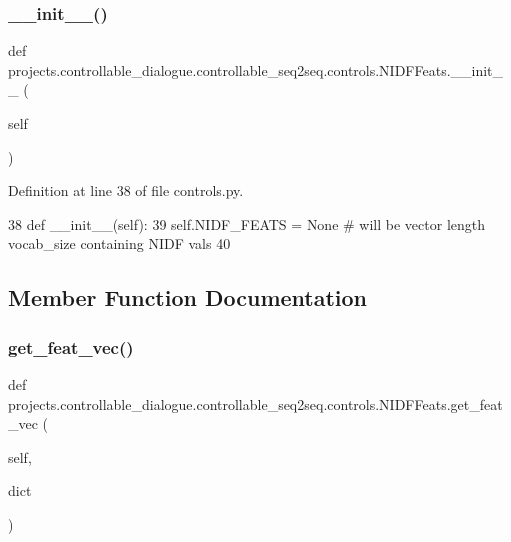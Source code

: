 \subsubsection{\texorpdfstring{\+\_\+\+\_\+init\+\_\+\+\_\+()}{\_\_init\_\_()}}
{\footnotesize\ttfamily def projects.\+controllable\+\_\+dialogue.\+controllable\+\_\+seq2seq.\+controls.\+N\+I\+D\+F\+Feats.\+\_\+\+\_\+init\+\_\+\+\_\+ (\begin{DoxyParamCaption}\item[{}]{self }\end{DoxyParamCaption})}



Definition at line 38 of file controls.\+py.


\begin{DoxyCode}
38     \textcolor{keyword}{def }\_\_init\_\_(self):
39         self.NIDF\_FEATS = \textcolor{keywordtype}{None}  \textcolor{comment}{# will be vector length vocab\_size containing NIDF vals}
40 
\end{DoxyCode}


\subsection{Member Function Documentation}
\mbox{\label{classprojects_1_1controllable__dialogue_1_1controllable__seq2seq_1_1controls_1_1NIDFFeats_a43490f17254d5695620c6cc63eb2e491}} 
\subsubsection{\texorpdfstring{get\+\_\+feat\+\_\+vec()}{get\_feat\_vec()}}
{\footnotesize\ttfamily def projects.\+controllable\+\_\+dialogue.\+controllable\+\_\+seq2seq.\+controls.\+N\+I\+D\+F\+Feats.\+get\+\_\+feat\+\_\+vec (\begin{DoxyParamCaption}\item[{}]{self,  }\item[{}]{dict }\end{DoxyParamCaption})}

